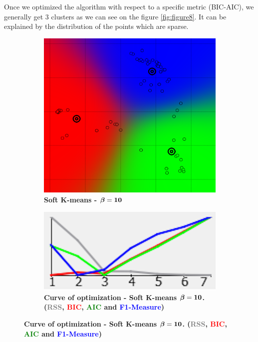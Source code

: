 Once we optimized the algorithm with respect to a specific metric (BIC-AIC), we generally get 3 clusters as we can see on the figure \ref{fig:figure8}. It can be explained by the distribution of the points which are sparse.

\begin{figure} [ht]
\centering
	\begin{subfigure}[t]{0.25\textwidth}
    \centering
	\includegraphics[height=0.08\textheight]{./clustering/opt_AIC_k_soft_beta_10_range7.png}
	\caption{\bf Soft K-means - $\boldsymbol \beta \bf=10$}
	\end{subfigure}
	\hspace{20mm}
    \begin{subfigure}[t]{0.50\textwidth}
    \centering
	\includegraphics[height=0.08\textheight]{./clustering/curve_opt_AIC_k_soft_beta_10_range7.png}
	\caption{\bf Curve of optimization - Soft K-means $\boldsymbol \beta \bf = 10$. (\textcolor{gray}{RSS}, \textcolor{red}{BIC}, \textcolor{green}{AIC} and \textcolor{blue}{F1-Measure})}

\end{subfigure}
\end{figure}
